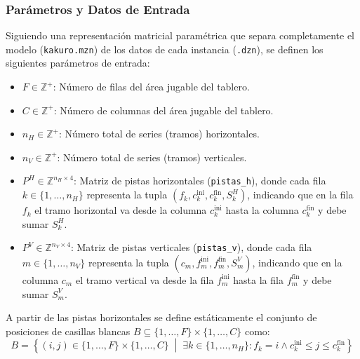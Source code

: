 \subsubsection{Parámetros y Datos de Entrada}
Siguiendo una representación matricial paramétrica que separa completamente el modelo (\texttt{kakuro.mzn}) de los datos de cada instancia (\texttt{.dzn}), se definen los siguientes parámetros de entrada:
\begin{itemize}
    \item $F \in \mathbb{Z}^+$: Número de filas del área jugable del tablero.
    \item $C \in \mathbb{Z}^+$: Número de columnas del área jugable del tablero.
    \item $n_H \in \mathbb{Z}^+$: Número total de series (tramos) horizontales.
    \item $n_V \in \mathbb{Z}^+$: Número total de series (tramos) verticales.
    \item $P^H \in \mathbb{Z}^{n_H \times 4}$: Matriz de pistas horizontales (\texttt{pistas\_h}), donde cada fila $k \in \{1, \dots, n_H\}$ representa la tupla $(f_k, c^{\text{ini}}_k, c^{\text{fin}}_k, S^H_k)$, indicando que en la fila $f_k$ el tramo horizontal va desde la columna $c^{\text{ini}}_k$ hasta la columna $c^{\text{fin}}_k$ y debe sumar $S^H_k$.
    \item $P^V \in \mathbb{Z}^{n_V \times 4}$: Matriz de pistas verticales (\texttt{pistas\_v}), donde cada fila $m \in \{1, \dots, n_V\}$ representa la tupla $(c_m, f^{\text{ini}}_m, f^{\text{fin}}_m, S^V_m)$, indicando que en la columna $c_m$ el tramo vertical va desde la fila $f^{\text{ini}}_m$ hasta la fila $f^{\text{fin}}_m$ y debe sumar $S^V_m$.
\end{itemize}

A partir de las pistas horizontales se define estáticamente el conjunto de posiciones de casillas blancas $B \subseteq \{1, \dots, F\} \times \{1, \dots, C\}$ como:
\[
    B = \left\{ (i, j) \in \{1, \dots, F\} \times \{1, \dots, C\} \;\middle|\; \exists k \in \{1, \dots, n_H\} : f_k = i \land c^{\text{ini}}_k \le j \le c^{\text{fin}}_k \right\}
\]


